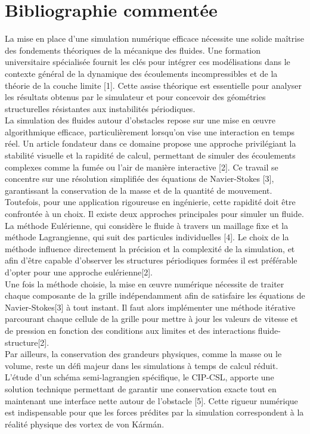 \documentclass{article}
\begin{document}
\section*{Bibliographie commentée}

La mise en place d'une simulation numérique efficace nécessite une solide maîtrise des 
fondements théoriques de la mécanique des fluides. Une formation universitaire spécialisée 
fournit les clés pour intégrer ces modélisations dans le contexte général de la dynamique 
des écoulements incompressibles et de la théorie de la couche limite [1]. Cette assise 
théorique est essentielle pour analyser les résultats obtenus par le simulateur et pour 
concevoir des géométries structurelles résistantes aux instabilités périodiques.\\

La simulation des fluides autour d'obstacles repose sur une mise en œuvre algorithmique 
efficace, particulièrement lorsqu'on vise une interaction en temps réel. Un article fondateur 
dans ce domaine propose une approche privilégiant la stabilité visuelle et la rapidité de 
calcul, permettant de simuler des écoulements complexes comme la fumée ou l'air de manière 
interactive [2]. Ce travail se concentre sur une résolution simplifiée des équations de 
Navier-Stokes [3], garantissant la conservation de la masse et de la quantité de mouvement.\\

Toutefois, pour une application rigoureuse en ingénierie, cette rapidité doit être confrontée 
à un choix. Il existe deux approches principales pour simuler un fluide. La méthode Eulérienne, qui 
considère le fluide à travers un maillage fixe et la méthode Lagrangienne, qui suit des particules
individuelles [4]. Le choix de la méthode influence directement la précision et la complexité
de la simulation, et afin d'être capable d'observer les structures périodiques formées il est
préférable d'opter pour une approche eulérienne[2].\\

Une fois la méthode choisie, la mise en œuvre numérique nécessite de traiter chaque 
composante de la grille indépendamment afin de satisfaire les équations de Navier-Stokes[3] à
tout instant. Il faut alors implémenter une méthode itérative parcourant chaque cellule de la
grille pour mettre à jour les valeurs de vitesse et de pression en fonction des conditions aux
limites et des interactions fluide-structure[2].\\

Par ailleurs, la conservation des grandeurs physiques, comme la masse ou le volume, reste un 
défi majeur dans les simulations à temps de calcul réduit. L'étude d'un schéma semi-lagrangien 
spécifique, le CIP-CSL, apporte une solution technique permettant de garantir une conservation 
exacte tout en maintenant une interface nette autour de l'obstacle [5]. Cette rigueur 
numérique est indispensable pour que les forces prédites par la simulation correspondent à la 
réalité physique des vortex de von Kármán.\\
\end{document}
